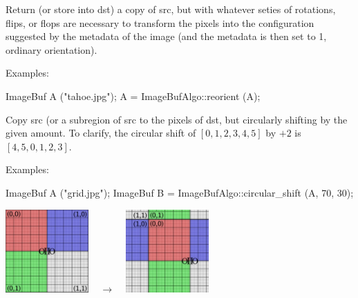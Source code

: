 Return (or store into {\cf dst}) a copy of {\cf src}, but with whatever
seties of rotations, flips, or flops are necessary to transform the pixels
into the configuration suggested by the  metadata of the
image (and the  metadata is then set to 1, ordinary
orientation).

\smallskip
\noindent Examples:
\begin{code}
    ImageBuf A ("tahoe.jpg");
    A = ImageBufAlgo::reorient (A);
\end{code}
\apiend



 

Copy {\cf src} (or a subregion of {\cf src} to the pixels of {\cf dst},
but circularly shifting by the given amount.  To clarify, the circular
shift of $[0,1,2,3,4,5]$ by $+2$ is $[4,5,0,1,2,3]$.

\smallskip
\noindent Examples:
\begin{code}
    ImageBuf A ("grid.jpg");
    ImageBuf B = ImageBufAlgo::circular_shift (A, 70, 30);
\end{code}
\spc \includegraphics[width=1.25in]{figures/grid-small.jpg} 
~ {\Huge $\rightarrow$} ~
\includegraphics[width=1.25in]{figures/cshift.jpg} \\
\apiend


